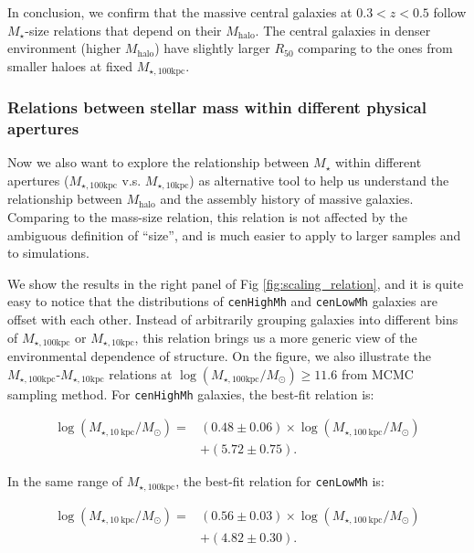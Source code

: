 \documentclass{emulateapj}
\def\rbcg{\texttt{cenHighMh}}
\def\nbcg{\texttt{cenLowMh}}
\def\mstar{{$M_{\star}$}}
\def\mhalo{{$M_{\mathrm{halo}}$}}
\def\minn{{$M_{\star,10\mathrm{kpc}}$}}
\def\mtot{{$M_{\star,100\mathrm{kpc}}$}}
\def\logmtot{{$\log (M_{\star,100\mathrm{kpc}}/M_{\odot})$}}
\begin{document}
\begin{CJK*}{UTF8}{gbsn}
    In conclusion, we confirm that the massive central galaxies at $0.3 < z < 0.5$
    follow \mstar{}-size relations that depend on their \mhalo{}. 
    The central galaxies in denser environment (higher \mhalo{}) have slightly 
    larger $R_{\mathrm{50}}$ comparing to the ones from smaller haloes at fixed 
    \mtot{}. 
    
\subsubsection{Relations between stellar mass within different physical apertures}
    \label{sssec:m100_m10}
    
    Now we also want to explore the relationship between \mstar{} within different
    apertures (\mtot{} v.s. \minn{}) as alternative tool to help us understand the 
    relationship between \mhalo{} and the assembly history of massive galaxies.   
    Comparing to the mass-size relation, this relation is not affected by the 
    ambiguous definition of ``size'', and is much easier to apply to larger samples 
    and to simulations. 
     
    We show the results in the right panel of Fig \ref{fig:scaling_relation}, and it 
    is quite easy to notice that the distributions of \rbcg{} and \nbcg{} galaxies 
    are offset with each other.  
    Instead of arbitrarily grouping galaxies into different bins of \mtot{} or 
    \minn{}, this relation brings us a more generic view of the environmental 
    dependence of structure.
    On the figure, we also illustrate the \mtot{}-\minn{} relations at 
    \logmtot$\geq 11.6$ from MCMC sampling method.  
    For \rbcg{} galaxies, the best-fit relation is:
    
    \begin{equation}
        \begin{aligned}
        \log (M_{\star, 10\ \mathrm{kpc}}/M_{\odot}) = & (0.48\pm0.06) \times \log (M_{\star, 100\ \mathrm{kpc}}/M_{\odot}) \\ & +(5.72\pm0.75).
        \end{aligned}
    \end{equation}
    
    \noindent In the same range of \mtot{}, the best-fit relation for \nbcg{} is:
     
    \begin{equation}
        \begin{aligned}
        \log (M_{\star, 10\ \mathrm{kpc}}/M_{\odot}) = & (0.56\pm0.03) \times \log (M_{\star, 100\ \mathrm{kpc}}/M_{\odot}) \\ & +(4.82\pm0.30).
        \end{aligned}
    \end{equation}
     

\end{CJK*}
\end{document}
